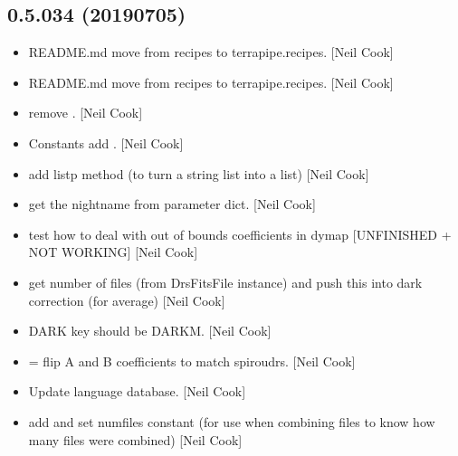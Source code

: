 \documentclass[a4paper,10pt,english]{report}
\begin{document}
\subsection{0.5.034 (2019\sphinxhyphen{}07\sphinxhyphen{}05)}
\label{\detokenize{misc/changelog:id124}}\begin{itemize}
\item {} 
README.md \sphinxhyphen{} move from recipes to terrapipe.recipes. {[}Neil Cook{]}

\item {} 
README.md \sphinxhyphen{} move from recipes to terrapipe.recipes. {[}Neil Cook{]}

\item {} 
 \sphinxhyphen{} remove . {[}Neil Cook{]}

\item {} 
Constants \sphinxhyphen{} add . {[}Neil Cook{]}

\item {} 
 \sphinxhyphen{} add listp method (to turn a string list into a
list) {[}Neil Cook{]}

\item {} 
 \sphinxhyphen{} get the nightname from parameter dict. {[}Neil
Cook{]}

\item {} 
 \sphinxhyphen{} test how to deal with out of bounds
coefficients in dymap {[}UNFINISHED + NOT WORKING{]} {[}Neil Cook{]}

\item {} 
 \sphinxhyphen{} get number of files (from DrsFitsFile
instance) and push this into dark correction (for average) {[}Neil Cook{]}

\item {} 
 \sphinxhyphen{} DARK key should be DARKM. {[}Neil Cook{]}

\item {} 
 = flip A and B coefficients to
match spiroudrs. {[}Neil Cook{]}

\item {} 
Update language database. {[}Neil Cook{]}

\item {} 
 \sphinxhyphen{} add and set numfiles constant (for use when combining
files to know how many files were combined) {[}Neil Cook{]}


\end{itemize}
\end{document}
